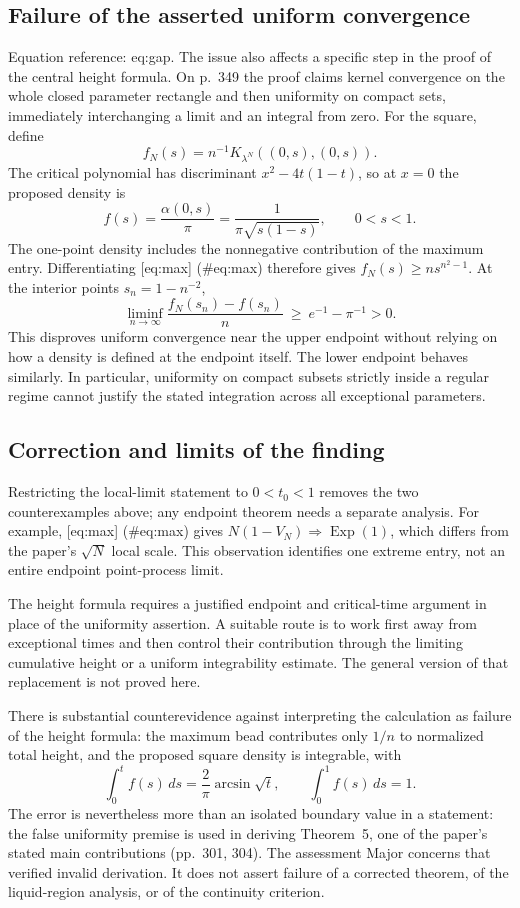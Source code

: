 \documentclass[10pt]{article}
\begin{document}
\subsection*{Failure of the asserted uniform convergence}
Equation reference: eq:gap. The issue also affects a specific step in the proof of the central height formula. On p. 349 the proof claims kernel convergence on the whole closed parameter rectangle and then uniformity on compact sets, immediately interchanging a limit and an integral from zero. For the square, define \[f_N(s)=n^{-1}K_{\lambda^N}((0,s),(0,s)).\] The critical polynomial has discriminant \(x^2-4t(1-t)\), so at \(x=0\) the proposed density is \[f(s)=\frac{\alpha(0,s)}{\pi}
     =\frac{1}{\pi\sqrt{s(1-s)}},\qquad 0<s<1.\] The one-point density includes the nonnegative contribution of the maximum entry. Differentiating [eq:max] (\#eq:max) therefore gives \(f_N(s)\ge n s^{n^2-1}\). At the interior points \(s_n=1-n^{-2}\), \[
 \liminf_{n\to\infty}\frac{f_N(s_n)-f(s_n)}{n}
 \ \ge\ e^{-1}-\pi^{-1}>0 .\] This disproves uniform convergence near the upper endpoint without relying on how a density is defined at the endpoint itself. The lower endpoint behaves similarly. In particular, uniformity on compact subsets strictly inside a regular regime cannot justify the stated integration across all exceptional parameters.\par
\subsection*{Correction and limits of the finding}
Restricting the local-limit statement to \(0<t_0<1\) removes the two counterexamples above; any endpoint theorem needs a separate analysis. For example, [eq:max] (\#eq:max) gives \(N(1-V_N)\Rightarrow\operatorname{Exp}(1)\), which differs from the paper’s \(\sqrt N\) local scale. This observation identifies one extreme entry, not an entire endpoint point-process limit.\par
The height formula requires a justified endpoint and critical-time argument in place of the uniformity assertion. A suitable route is to work first away from exceptional times and then control their contribution through the limiting cumulative height or a uniform integrability estimate. The general version of that replacement is not proved here.\par
There is substantial counterevidence against interpreting the calculation as failure of the height formula: the maximum bead contributes only \(1/n\) to normalized total height, and the proposed square density is integrable, with \[\int_0^t f(s)\,ds=\frac{2}{\pi}\arcsin\sqrt t,\qquad
 \int_0^1 f(s)\,ds=1.\] The error is nevertheless more than an isolated boundary value in a statement: the false uniformity premise is used in deriving Theorem 5, one of the paper’s stated main contributions (pp. 301, 304). The assessment Major concerns that verified invalid derivation. It does not assert failure of a corrected theorem, of the liquid-region analysis, or of the continuity criterion.\par
\end{document}
